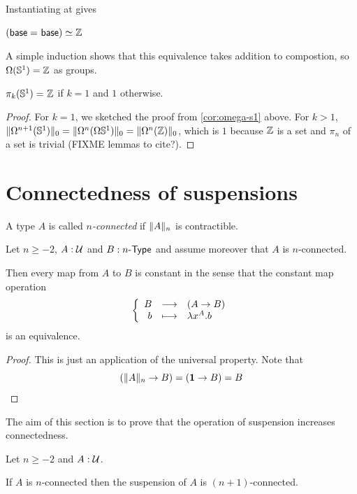 Instantiating at {\base} gives
\begin{cor}\label{cor:omega-s1}
$\eqv {(\id{\base}{\base})} {\Z}$
\end{cor}

A simple induction shows that this equivalence takes addition to
compostion, so $\Omega(\Sn ^1) = \Z$ as groups.  

\begin{cor}
$\id{\pi_k(\Sn ^1)} {\Z}$ if $k = 1$ and $1$ otherwise.  
\end{cor}
\begin{proof}
For $k=1$, we sketched the proof from \autoref{cor:omega-s1} above.
For $k > 1$, $\trunc 0 {\Omega^{n+1}(\Sn ^1)} = \trunc 0
{\Omega^n(\Omega{\Sn ^1})} = \trunc 0 {\Omega^n(\Z)}$, which is
  $1$ because $\Z$ is a set and $\pi_n$ of a set is trivial (FIXME
  lemmas to cite?).
\end{proof}


\section{Connectedness of suspensions}
\label{sec:conn-susp}

\begin{defn}
  A type $A$ is called \emph{$n$-connected} if $\trunc nA$ is contractible.
\end{defn}

\begin{lem}
  \label{connectedtotruncated}
  Let $n\ge-2$, $A:\type$ and $B:\typele{n}$ and assume moreover that $A$ is
  $n$-connected.

  Then every map from $A$ to $B$ is constant in the sense that the constant map
  operation
  \[\function{B}{(A\to{}B)}{b}{\lambda{}x^A.b}\]
  is an equivalence.
\end{lem}
\begin{proof}
  This is just an application of the universal property. Note that
  \[(\trunc nA\to{}B)=(\unit\to{}B)=B \qedhere\]
\end{proof}

The aim of this section is to prove that the operation of suspension increases
connectedness.

\begin{thm}
  Let $n\ge-2$ and $A:\type$.

  If $A$ is $n$-connected then the suspension of $A$ is $(n+1)$-connected.
\end{thm}

